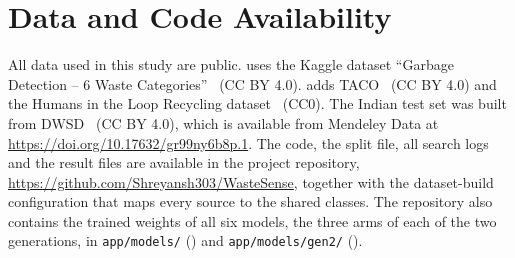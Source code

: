 \section*{Data and Code Availability}
All data used in this study are public. \genone uses the Kaggle dataset ``Garbage Detection -- 6 Waste Categories''~\cite{viswaprakash2024garbage} (CC BY 4.0). \gentwo adds TACO~\cite{proenca2020taco} (CC BY 4.0) and the Humans in the Loop Recycling dataset~\cite{hitl2026recycling} (CC0). The Indian test set was built from DWSD~\cite{ali2025dwsd} (CC BY 4.0), which is available from Mendeley Data at \url{https://doi.org/10.17632/gr99ny6b8p.1}. The code, the split file, all search logs and the result files are available in the project repository, \url{https://github.com/Shreyansh303/WasteSense}, together with the dataset-build configuration that maps every source to the shared classes. The repository also contains the trained weights of all six models, the three arms of each of the two generations, in \texttt{app/models/} (\genone) and \texttt{app/models/gen2/} (\gentwo).
